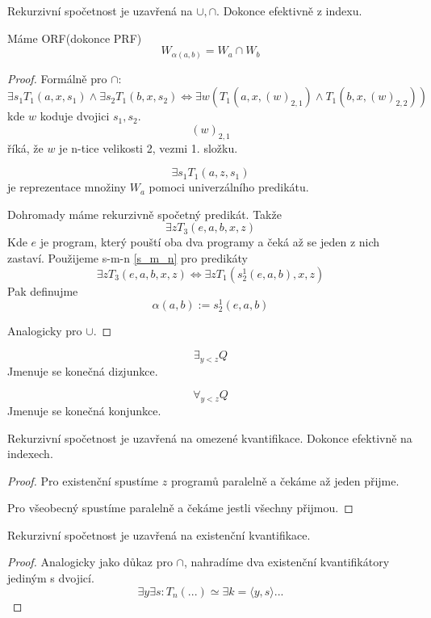 \begin{theorem}[Uzavřenost RS]
	Rekurzivní spočetnost je uzavřená na $\cup, \cap$.
	Dokonce efektivně z indexu.

	Máme ORF(dokonce PRF)
	\[ W_{\alpha(a, b)} = W_a \cap W_b \]
\end{theorem}
\begin{proof}
	Formálně pro $\cap$:
	\[ \exists s_1 T_1(a, x, s_1) \land \exists s_2 T_1(b, x, s_2) \iff \exists w(T_1(a, x, (w)_{2,1}) \land T_1(b, x, (w)_{2,2})) \]
	kde $w$ koduje dvojici $s_1, s_2$.
	\[ (w)_{2,1} \]
	říká, že $w$ je n-tice velikosti 2, vezmi 1. složku.

	\[ \exists s_1 T_1(a, z, s_1) \]
	je reprezentace množiny $W_a$ pomoci univerzálního predikátu.

	Dohromady máme rekurzivně spočetný predikát. Takže
	\[ \exists z T_3(e, a, b, x, z) \]
	Kde $e$ je program, který pouští oba dva programy a čeká až se jeden z nich zastaví.
	Použijeme s-m-n \cref{s_m_n} pro predikáty
	\[ \exists z T_3(e, a, b, x, z) \iff \exists z T_1(s_2^1(e, a, b), x , z) \]
	Pak definujme
	\[ \alpha(a, b) := s_2^1(e, a, b) \]

	Analogicky pro $\cup$.
\end{proof}


\begin{definition}
	\[ \exists_{y < z} Q \]
	Jmenuje se konečná dizjunkce.
\end{definition}

\begin{definition}
	\[ \forall_{y < z} Q \]
	Jmenuje se konečná konjunkce.
\end{definition}

\begin{theorem}\label{omez_kvant}
	Rekurzivní spočetnost je uzavřená na omezené kvantifikace.
	Dokonce efektivně na indexech.
\end{theorem}
\begin{proof}
	Pro existenční spustíme $z$ programů paralelně a čekáme až jeden přijme.

	Pro všeobecný spustíme paralelně a čekáme jestli všechny přijmou.
\end{proof}

\begin{theorem}\label{neomez_kvant}
	Rekurzivní spočetnost je uzavřená na existenční kvantifikace.
\end{theorem}
\begin{proof}
	Analogicky jako důkaz pro $\cap$, nahradíme dva existenční kvantifikátory jediným s dvojicí.
	\[ \exists y \exists s: T_n(...) \simeq \exists k = \langle y, s \rangle ... \]
\end{proof}

